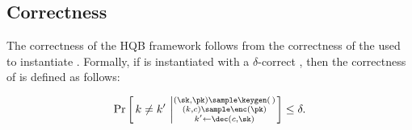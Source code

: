     \subsection{Correctness}

    The correctness of the HQB framework follows from the correctness of the \kem used to instantiate \hqb.
    Formally, if \hqb is instantiated with a $\delta$-correct \kem, then the correctness of \hqb is defined as follows:

    \[
        \Pr \left[\,  k \ne k' \, \left | \substack{(\sk, \pk) \sample \keygen(\,) \\ (k, c) \sample \enc(\pk) \\ k' \gets \dec(c, \sk) } \right. \right] \le \delta .
    \]
